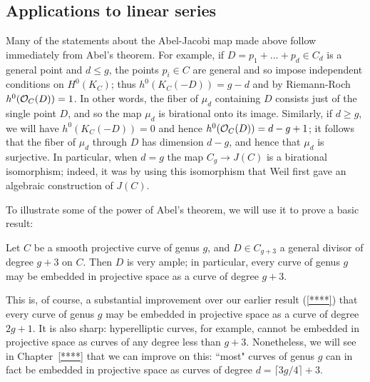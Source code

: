 \subsection{Applications to linear series}
Many of the statements about the Abel-Jacobi map made above follow immediately from Abel's theorem. For example, if  $D = p_1+\dots+p_d\in C_d$ is a general point and $d \leq g$, the points $p_i \in C$ are general and so impose independent conditions on $H^0(K_C)$; thus $h^0(K_C(-D)) = g-d$ and by Riemann-Roch $h^0(\cO_C(D)) = 1$. In other words, the fiber of $\mu_d$ containing $D$ consists just of the single point $D$, and so the map $\mu_d$ is birational onto its image. Similarly, if $d \geq g$, we will have $h^0(K_C(-D)) = 0$ and hence $h^0(\cO_C(D)) = d-g+1$; it follows that the fiber of $\mu_d$ through $D$ has dimension $d-g$, and hence that $\mu_d$ is surjective. In particular, when $d=g$ the map $C_g \to J(C)$ is a birational isomorphism; indeed, it was by using this isomorphism that Weil first gave an algebraic construction of $J(C)$.

To illustrate some of the power of Abel's theorem, we will use it to prove a basic result:

\begin{theorem}\label{g+3 theorem}
Let $C$ be a smooth projective curve of genus $g$, and $D \in C_{g+3}$ a general divisor of degree $g+3$ on $C$. Then $D$ is very ample; in particular, every curve of genus $g$ may be embedded in projective space as a curve of degree $g+3$.
\end{theorem}

This is, of course, a substantial improvement over our earlier result (\ref{****}) that every curve of genus $g$ may be embedded in projective space as a curve of degree $2g+1$. It is also sharp: hyperelliptic curves, for example, cannot be embedded in projective space as curves of any degree less than $g+3$. Nonetheless, we will see in Chapter~\ref{****} that we can improve on this: ``most" curves of genus $g$ can in fact be embedded in projective space as curves of degree $d = \lceil 3g/4 \rceil + 3$.

